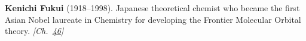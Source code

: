 \nobelchemistry \textbf{Kenichi Fukui} (1918–1998). Japanese theoretical chemist who became the first Asian Nobel laureate in Chemistry for developing the Frontier Molecular Orbital theory. \emph{[Ch.~\hyperref[ch:woodwardhoffmannrules]{46}]}

